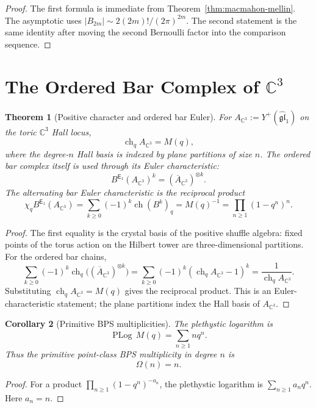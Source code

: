 \documentclass[11pt]{article}
\newtheorem{theorem}{Theorem}[section]
\newtheorem{corollary}[theorem]{Corollary}
\theoremstyle{definition}
\theoremstyle{remark}
\newcommand{\Cthree}{\mathbb{C}^{3}}
\newcommand{\Yp}{Y^{+}}
\newcommand{\fglone}{\widehat{\mathfrak{gl}}_{1}}
\newcommand{\Eone}{\mathsf{E}_{1}}
\newcommand{\Mac}{M}
\newcommand{\PLog}{\operatorname{PLog}}
\newcommand{\ch}{\operatorname{ch}}
\newcommand{\Bnum}[1]{B_{#1}}
\begin{document}
\begin{proof}
The first formula is immediate from Theorem~\ref{thm:macmahon-mellin}.
The asymptotic uses
$|\Bnum{2m}|\sim2(2m)!/(2\pi)^{2m}$. The second statement is the same
identity after moving the second Bernoulli factor into the comparison
sequence.
\end{proof}

\section{The Ordered Bar Complex of $\Cthree$}
\label{sec:c3-bar-complex}

\begin{theorem}[Positive character and ordered bar Euler]
\label{thm:bar-poincare-euler}
For $A_{\Cthree}:=\Yp(\fglone)$ on the toric $\Cthree$ Hall locus,
\[
  \ch_q A_{\Cthree}
  =
  \Mac(q),
\]
where the degree-$n$ Hall basis is indexed by plane partitions of size
$n$. The ordered bar complex itself is used through its Euler
characteristic:
\[
  B^{\Eone}(A_{\Cthree})^k=(\overline{A}_{\Cthree})^{\otimes k}.
\]
The alternating bar Euler characteristic is the reciprocal product
\[
  \chi_q B^{\Eone}(A_{\Cthree})
  =
  \sum_{k\geq0}(-1)^k\ch(B^k)_q
  =
  \Mac(q)^{-1}
  =
  \prod_{n\geq1}(1-q^n)^n.
\]
\end{theorem}

\begin{proof}
The first equality is the crystal basis of the positive shuffle
algebra: fixed points of the torus action on the Hilbert tower are
three-dimensional partitions. For the ordered bar chains,
\[
  \sum_{k\geq0}(-1)^k\ch_q
  \bigl((\overline{A}_{\Cthree})^{\otimes k}\bigr)
  =
  \sum_{k\geq0}(-1)^k(\ch_q A_{\Cthree}-1)^k
  =
  \frac{1}{\ch_q A_{\Cthree}}.
\]
Substituting $\ch_q A_{\Cthree}=\Mac(q)$ gives the reciprocal product.
This is an Euler-characteristic statement; the plane partitions index
the Hall basis of $A_{\Cthree}$.
\end{proof}

\begin{corollary}[Primitive BPS multiplicities]
\label{cor:primitive-bps}
The plethystic logarithm is
\[
  \PLog\,\Mac(q)=\sum_{n\geq1}nq^n.
\]
Thus the primitive point-class BPS multiplicity in degree $n$ is
\[
  \Omega(n)=n.
\]
\end{corollary}

\begin{proof}
For a product $\prod_{n\geq1}(1-q^n)^{-a_n}$, the plethystic logarithm
is $\sum_{n\geq1}a_nq^n$. Here $a_n=n$.
\end{proof}
\end{document}
